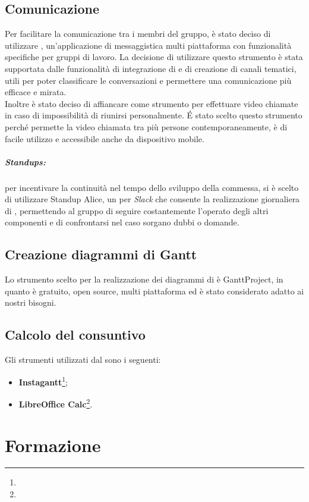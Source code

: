 \documentclass[NormeDiProgetto.tex]{subfiles}
\begin{document}
	\subsection{Comunicazione}
	Per facilitare la comunicazione tra i membri del gruppo, è stato deciso di utilizzare , un'applicazione di messaggistica multi piattaforma con funzionalità specifiche per gruppi di lavoro. La decisione di utilizzare questo strumento è stata supportata dalle funzionalità di integrazione di  e di creazione di canali tematici, utili per poter classificare le conversazioni e permettere una comunicazione più efficace e mirata.\\
	Inoltre è stato deciso di affiancare  come strumento per effettuare video chiamate in caso di impossibilità di riunirsi personalmente. \'{E} stato scelto questo strumento perché permette la video chiamata tra più persone contemporaneamente, è di facile utilizzo e accessibile anche da dispositivo mobile.\\

	\subparagraph{Standups:} per incentivare la continuità nel tempo dello sviluppo della commessa, si è scelto di utilizzare Standup Alice, un  per \emph{Slack} che consente la realizzazione giornaliera di , permettendo al gruppo di seguire costantemente l'operato degli altri componenti e di confrontarsi nel caso sorgano dubbi o domande.

	\subsection{Creazione diagrammi di Gantt}
	Lo strumento scelto per	la realizzazione dei diagrammi di  è GanttProject, in quanto è gratuito, open source, multi piattaforma ed è stato considerato adatto ai nostri bisogni.
	\subsection{Calcolo del consuntivo}
	Gli strumenti utilizzati dal \respdiprog sono i seguenti:
	\begin{itemize}
		\item \textbf{Instagantt}\footnote{};
		\item \textbf{LibreOffice Calc}\footnote{}.
	\end{itemize}
	
	\section{Formazione}
\end{document}
